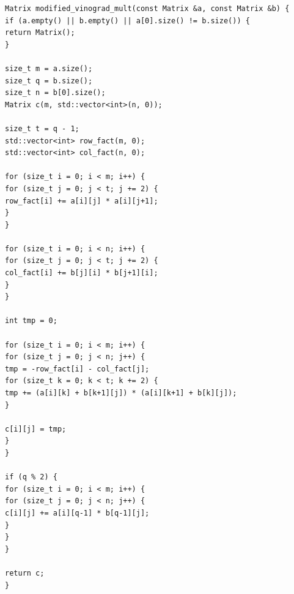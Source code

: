 \documentclass[a4paper,12pt]{article}
\begin{document}
\begin{lstlisting}[label=lst1, caption=Реализация оптимизированного алгоритма умножения матриц по Винограду]
Matrix modified_vinograd_mult(const Matrix &a, const Matrix &b) {
if (a.empty() || b.empty() || a[0].size() != b.size()) {
return Matrix();
}

size_t m = a.size();
size_t q = b.size();
size_t n = b[0].size();
Matrix c(m, std::vector<int>(n, 0));

size_t t = q - 1;
std::vector<int> row_fact(m, 0);
std::vector<int> col_fact(n, 0);

for (size_t i = 0; i < m; i++) {
for (size_t j = 0; j < t; j += 2) {
row_fact[i] += a[i][j] * a[i][j+1];
}
}

for (size_t i = 0; i < n; i++) {
for (size_t j = 0; j < t; j += 2) {
col_fact[i] += b[j][i] * b[j+1][i];
}
}

int tmp = 0;

for (size_t i = 0; i < m; i++) {
for (size_t j = 0; j < n; j++) {
tmp = -row_fact[i] - col_fact[j];
for (size_t k = 0; k < t; k += 2) {
tmp += (a[i][k] + b[k+1][j]) * (a[i][k+1] + b[k][j]);
}

c[i][j] = tmp;
}
}

if (q % 2) {
for (size_t i = 0; i < m; i++) {
for (size_t j = 0; j < n; j++) {
c[i][j] += a[i][q-1] * b[q-1][j];
}
}
}

return c;
}
\end{lstlisting}
\end{document}
